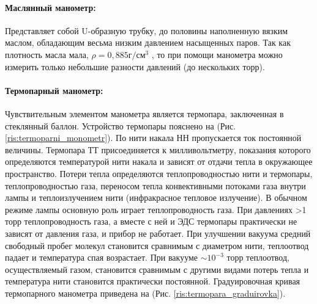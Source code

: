 \documentclass[a4paper]{article}
\begin{document}
    \paragraph{Маслянный манометр:}
    Представляет собой U-образную трубку, до половины наполненную вязким маслом, обладающим весьма низким давлением насыщенных паров. Так как плотность масла мала, $\rho = 0,885 г/см^3$ , то при помощи манометра можно измерить только небольшие разности давлений (до нескольких торр).

    \paragraph{Термопарный манометр:}
    Чувствительным элементом манометра является термопара, заключенная в стеклянный баллон. Устройство термопары пояснено на (Рис. \ref{ris:termoparni_monometr}). По нити накала НН пропускается ток постоянной величины. Термопара ТТ присоединяется к милливольтметру, показания которого определяются температурой нити накала и зависят от отдачи тепла в окружающее пространство. Потери тепла определяются теплопроводностью нити и термопары, теплопроводностью газа, переносом тепла конвективными потоками газа внутри лампы и теплоизлучением нити (инфракрасное тепловое излучение). В обычном режиме лампы основную роль играет теплопроводность газа. При давлениях >1 торр теплопроводность газа, а вместе с ней и ЭДС термопары практически не зависят от давления газа, и прибор не работает. При улучшении вакуума средний свободный пробег молекул становится сравнимым с диаметром нити, теплоотвод падает и температура спая возрастает. При вакууме $\sim 10^{-3}$ торр теплоотвод, осуществляемый газом, становится сравнимым с другими видами потерь тепла и температура нити становится практически постоянной. Градуировочная кривая термопарного манометра приведена на (Рис. \ref{ris:termopara_graduirovka}).
\end{document}
